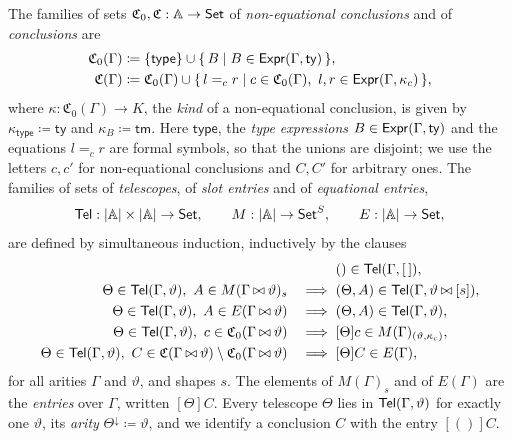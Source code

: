 \begin{definition}\label{def:hypothetical}
    The families of sets $\mathfrak{C}_0, \mathfrak{C} : \mathbb{A} \to \mathsf{Set}$ of \emph{non-equational conclusions} and of \emph{conclusions} are
    \begin{align*}
        \mathfrak{C}_0(\Gamma) &\coloneqq \{\mathsf{type}\} \cup \{\, B \mid B \in \mathsf{Expr}(\Gamma, \mathsf{ty}) \,\},\\
        \mathfrak{C}(\Gamma) &\coloneqq \mathfrak{C}_0(\Gamma) \cup \{\, l =_c r \mid c \in \mathfrak{C}_0(\Gamma),\ l, r \in \mathsf{Expr}(\Gamma, \kappa_c) \,\},
    \end{align*}
    where $\kappa : \mathfrak{C}_0(\Gamma) \to K$, the \emph{kind} of a non-equational conclusion, is given by $\kappa_{\mathsf{type}} \coloneqq \mathsf{ty}$ and $\kappa_B \coloneqq \mathsf{tm}$. Here $\mathsf{type}$, the \emph{type expressions} $B \in \mathsf{Expr}(\Gamma, \mathsf{ty})$ and the equations $l =_c r$ are formal symbols, so that the unions are disjoint; we use the letters $c, c'$ for non-equational conclusions and $C, C'$ for arbitrary ones. The families of sets of \emph{telescopes}, of \emph{slot entries} and of \emph{equational entries},
    \[
        \mathsf{Tel} : \left|\mathbb{A}\right| \times \left|\mathbb{A}\right| \to \mathsf{Set}, \qquad M : \left|\mathbb{A}\right| \to \mathsf{Set}^S, \qquad E : \left|\mathbb{A}\right| \to \mathsf{Set},
    \]
    are defined by simultaneous induction, inductively by the clauses
    \begin{alignat*}{2}
        & && () \in \mathsf{Tel}(\Gamma, \left[\,\right]),\\
        \Theta \in \mathsf{Tel}(\Gamma, \vartheta),\ A \in M(\Gamma \mathbin{\bowtie} \vartheta)_s &&\implies{}& (\Theta, A) \in \mathsf{Tel}(\Gamma, \vartheta \mathbin{\bowtie} [s]),\\
        \Theta \in \mathsf{Tel}(\Gamma, \vartheta),\ A \in E(\Gamma \mathbin{\bowtie} \vartheta) &&\implies{}& (\Theta, A) \in \mathsf{Tel}(\Gamma, \vartheta),\\
        \Theta \in \mathsf{Tel}(\Gamma, \vartheta),\ c \in \mathfrak{C}_0(\Gamma \mathbin{\bowtie} \vartheta) &&\implies{}& [\Theta]c \in M(\Gamma)_{(\vartheta, \kappa_c)},\\
        \Theta \in \mathsf{Tel}(\Gamma, \vartheta),\ C \in \mathfrak{C}(\Gamma \mathbin{\bowtie} \vartheta) \setminus \mathfrak{C}_0(\Gamma \mathbin{\bowtie} \vartheta) &&\implies{}& [\Theta]C \in E(\Gamma),
    \end{alignat*}
    for all arities $\Gamma$ and $\vartheta$, and shapes $s$.
    The elements of $M(\Gamma)_s$ and of $E(\Gamma)$ are the \emph{entries} over $\Gamma$, written $[\Theta]C$. Every telescope $\Theta$ lies in $\mathsf{Tel}(\Gamma, \vartheta)$ for exactly one $\vartheta$, its \emph{arity} $\Theta^{\downarrow} \coloneqq \vartheta$, and we identify a conclusion $C$ with the entry $[()]C$.
\end{definition}

